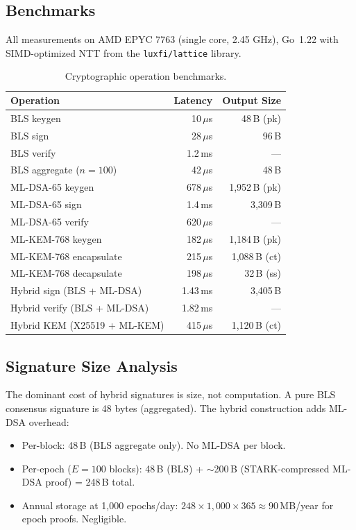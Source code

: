 \documentclass[11pt,a4paper]{article}
\begin{document}
\subsection{Benchmarks}

All measurements on AMD EPYC 7763 (single core, 2.45 GHz), Go~1.22 with SIMD-optimized
NTT from the \texttt{luxfi/lattice} library.

\begin{table}[ht]
\centering
\caption{Cryptographic operation benchmarks.}
\label{tab:benchmarks}
\begin{tabular}{lrr}
\toprule
\textbf{Operation} & \textbf{Latency} & \textbf{Output Size} \\
\midrule
BLS keygen & 10\,$\mu$s & 48\,B (pk) \\
BLS sign & 28\,$\mu$s & 96\,B \\
BLS verify & 1.2\,ms & --- \\
BLS aggregate ($n = 100$) & 42\,$\mu$s & 48\,B \\
\midrule
ML-DSA-65 keygen & 678\,$\mu$s & 1{,}952\,B (pk) \\
ML-DSA-65 sign & 1.4\,ms & 3{,}309\,B \\
ML-DSA-65 verify & 620\,$\mu$s & --- \\
\midrule
ML-KEM-768 keygen & 182\,$\mu$s & 1{,}184\,B (pk) \\
ML-KEM-768 encapsulate & 215\,$\mu$s & 1{,}088\,B (ct) \\
ML-KEM-768 decapsulate & 198\,$\mu$s & 32\,B (ss) \\
\midrule
Hybrid sign (BLS + ML-DSA) & 1.43\,ms & 3{,}405\,B \\
Hybrid verify (BLS + ML-DSA) & 1.82\,ms & --- \\
Hybrid KEM (X25519 + ML-KEM) & 415\,$\mu$s & 1{,}120\,B (ct) \\
\bottomrule
\end{tabular}
\end{table}

\subsection{Signature Size Analysis}

The dominant cost of hybrid signatures is size, not computation. A pure BLS consensus
signature is 48 bytes (aggregated). The hybrid construction adds ML-DSA overhead:

\begin{itemize}[leftmargin=2em]
  \item Per-block: 48\,B (BLS aggregate only). No ML-DSA per block.
  \item Per-epoch ($E = 100$ blocks): 48\,B (BLS) + $\sim$200\,B (STARK-compressed
        ML-DSA proof) = 248\,B total.
  \item Annual storage at 1{,}000 epochs/day: $248 \times 1{,}000 \times 365 \approx
        90$\,MB/year for epoch proofs. Negligible.
\end{itemize}
\end{document}
